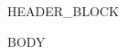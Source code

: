 \documentclass[10pt]{article}
\begin{document}
\begin{center}
{{HEADER_BLOCK}}
\end{center}

{{BODY}}
\end{document}

